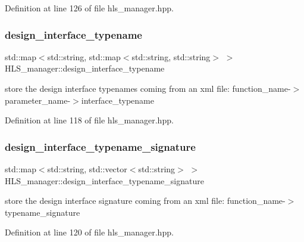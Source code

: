 Definition at line 126 of file hls\+\_\+manager.\+hpp.

\mbox{\label{classHLS__manager_ad3f5bf7e9716c1ca11f291f3cc940c17}} 
\subsubsection{\texorpdfstring{design\+\_\+interface\+\_\+typename}{design\_interface\_typename}}
{\footnotesize\ttfamily std\+::map$<$std\+::string, std\+::map$<$std\+::string, std\+::string$>$ $>$ H\+L\+S\+\_\+manager\+::design\+\_\+interface\+\_\+typename}



store the design interface typenames coming from an xml file\+: function\+\_\+name-\/$>$parameter\+\_\+name-\/$>$interface\+\_\+typename 



Definition at line 118 of file hls\+\_\+manager.\+hpp.

\mbox{\label{classHLS__manager_abe078d82e1b4bcd0d90e35641752ddb1}} 
\subsubsection{\texorpdfstring{design\+\_\+interface\+\_\+typename\+\_\+signature}{design\_interface\_typename\_signature}}
{\footnotesize\ttfamily std\+::map$<$std\+::string, std\+::vector$<$std\+::string$>$ $>$ H\+L\+S\+\_\+manager\+::design\+\_\+interface\+\_\+typename\+\_\+signature}



store the design interface signature coming from an xml file\+: function\+\_\+name-\/$>$typename\+\_\+signature 



Definition at line 120 of file hls\+\_\+manager.\+hpp.

\mbox{\label{classHLS__manager_a1b6155e191406f48cb6acb62f1b7452a}} 
